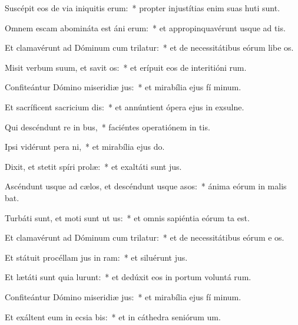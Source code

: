 \item Suscépit eos de via iniquitis erum:~* propter injustítias enim suas huti sunt.
\item Omnem escam abomináta est áni erum:~* et appropinquavérunt usque ad  tis.
\item Et clamavérunt ad Dóminum cum trilatur:~* et de necessitátibus eórum libe os.
\item Misit verbum suum, et savit os:~* et erípuit eos de interitióni rum.
\item Confiteántur Dómino miseridiæ jus:~* et mirabília ejus fí minum.
\item Et sacríficent sacricium dis:~* et annúntient ópera ejus in exsulne.
\item Qui descéndunt re in bus,~* faciéntes operatiónem in  tis.
\item Ipsi vidérunt pera ni,~* et mirabília ejus  do.
\item Dixit, et stetit spíri prolæ:~* et exaltáti sunt  jus.
\item Ascéndunt usque ad cælos, et descéndunt usque  asos:~* ánima eórum in malis bat.
\item Turbáti sunt, et moti sunt ut us:~* et omnis sapiéntia eórum ta est.
\item Et clamavérunt ad Dóminum cum trilatur:~* et de necessitátibus eórum e os.
\item Et státuit procéllam jus in ram:~* et siluérunt  jus.
\item Et lætáti sunt quia lurunt:~* et dedúxit eos in portum voluntá rum.
\item Confiteántur Dómino miseridiæ jus:~* et mirabília ejus fí minum.
\item Et exáltent eum in ecsia bis:~* et in cáthedra seniórum  um.
